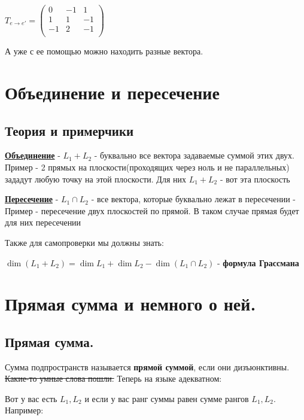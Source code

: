 \documentclass{article}
\begin{document}
$T_{e \rightarrow e'} = \begin{pmatrix}
    0 & -1 & 1\\
    1 & 1 & -1\\
    -1 & 2 & -1\\
\end{pmatrix}$

А уже с ее помощью можно находить разные вектора.

\pagebreak

\section{Объединение и пересечение}

\subsection{Теория и примерчики}
\textbf{\uline{Объединение}} - $L_1 + L_2$ - буквально все вектора задаваемые суммой этих двух. Пример - 2 прямых на плоскости(проходящих через ноль и не параллельных) зададут любую точку на этой плоскости. Для них $L_1 + L_2$ - вот эта плоскость


\textbf{\uline{Пересечение}} - $L_1 \cap L_2$ - все вектора, которые буквально лежат в пересечении - Пример - пересечение двух плоскостей по прямой. В таком случае прямая будет для них пересечении

Также для самопроверки мы должны знать:

$\dim (L_1 + L_2) = \dim L_1 + \dim L_2 - \dim (L_1 \cap L_2)$ - \textbf{формула Грассмана}

\pagebreak
\section{Прямая сумма и немного о ней.}

\subsection{Прямая сумма.}
Сумма подпространств называется \textbf{прямой суммой}, если они дизъюнктивны. \sout{Какие-то умные слова пошли.} Теперь на языке адекватном:

Вот у вас есть $L_1, L_2$ и если у вас ранг суммы равен сумме рангов $L_1, L_2$. Например:
\end{document}

